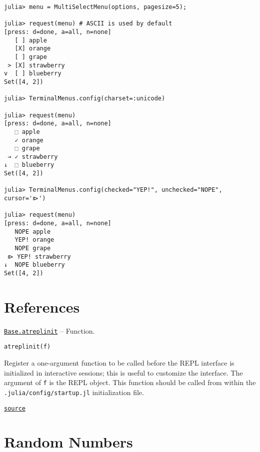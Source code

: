 \begin{verbatim}
julia> menu = MultiSelectMenu(options, pagesize=5);

julia> request(menu) # ASCII is used by default
[press: d=done, a=all, n=none]
   [ ] apple
   [X] orange
   [ ] grape
 > [X] strawberry
v  [ ] blueberry
Set([4, 2])

julia> TerminalMenus.config(charset=:unicode)

julia> request(menu)
[press: d=done, a=all, n=none]
   ⬚ apple
   ✓ orange
   ⬚ grape
 → ✓ strawberry
↓  ⬚ blueberry
Set([4, 2])

julia> TerminalMenus.config(checked="YEP!", unchecked="NOPE", cursor='⧐')

julia> request(menu)
[press: d=done, a=all, n=none]
   NOPE apple
   YEP! orange
   NOPE grape
 ⧐ YEP! strawberry
↓  NOPE blueberry
Set([4, 2])

\end{verbatim}



\hypertarget{13487828328085508990}{}


\chapter{References}


\hypertarget{1741947168860119796}{} 
\hyperlink{1741947168860119796}{\texttt{Base.atreplinit}}  -- {Function.}

\begin{adjustwidth}{2em}{0pt}


\begin{verbatim}
atreplinit(f)
\end{verbatim}

Register a one-argument function to be called before the REPL interface is initialized in interactive sessions; this is useful to customize the interface. The argument of \texttt{f} is the REPL object. This function should be called from within the \texttt{.julia/config/startup.jl} initialization file.



\href{https://github.com/JuliaLang/julia/blob/44fa15b1502a45eac76c9017af94332d4557b251/base/client.jl#L326-L333}{\texttt{source}}


\end{adjustwidth}

\hypertarget{6153433939819653500}{}


\chapter{Random Numbers}





